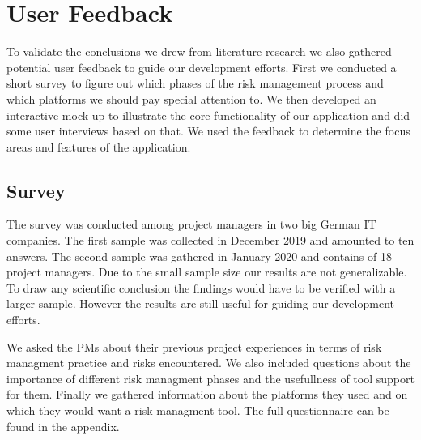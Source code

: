 
\section{User Feedback}
\label{sec:DomainA}
To validate the conclusions we drew from literature research we also gathered potential user feedback to guide our development efforts. First we conducted a short survey to figure out which phases of the risk management process and which platforms we should pay special attention to. We then developed an interactive mock-up to illustrate the core functionality of our application and did some user interviews based on that. We used the feedback to determine the focus areas and features of the application.
\subsection{Survey}
\label{sec:DomainAa}
The survey was conducted among project managers in two big German IT companies. The first sample was collected in December 2019 and amounted to ten answers. The second sample was gathered in January 2020 and contains of 18 project managers. Due to the small sample size our results are not generalizable. To draw any scientific conclusion the findings would have to be verified with a larger sample. However the results are still useful for guiding our development efforts.

We asked the PMs about their previous project experiences in terms of risk managment practice and risks encountered. We also included questions about the importance of different risk managment phases and the usefullness of tool support for them. Finally we gathered information about the platforms they used and on which they would want a risk managment tool. The full questionnaire can be found in the appendix.

